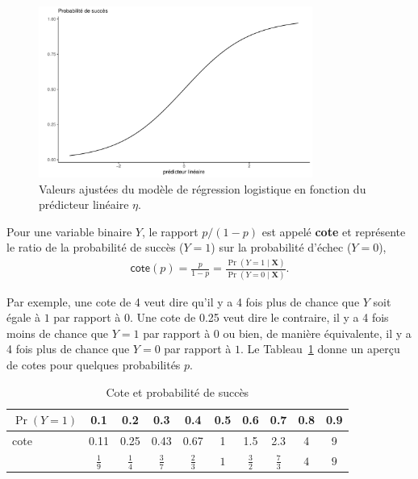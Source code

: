 \documentclass[
  11pt,
  letterpaper,
]{scrbook}
\theoremstyle{definition}
\theoremstyle{remark}
\begin{document}
\begin{figure}[ht!]

{\centering \includegraphics[width=0.8\textwidth,height=\textheight]{reglogistique_files/figure-pdf/fig-logitplot-1.pdf}

}

\caption{\label{fig-logitplot}Valeurs ajustées du modèle de régression
logistique en fonction du prédicteur linéaire \(\eta\).}

\end{figure}

Pour une variable binaire \(Y\), le rapport \(p/(1-p)\) est appelé
\textbf{cote} et représente le ratio de la probabilité de succès
(\(Y=1\)) sur la probabilité d'échec (\(Y=0\)), \begin{align*}
 \mathsf{cote}(p) = \frac{p}{1-p} = \frac{\Pr(Y=1 \mid \mathbf{X})}{\Pr(Y=0 \mid \mathbf{X})}.
\end{align*}

Par exemple, une cote de 4 veut dire qu'il y a 4 fois plus de chance que
\(Y\) soit égale à \(1\) par rapport à \(0\). Une cote de 0.25 veut dire
le contraire, il y a 4 fois moins de chance que \(Y=1\) par rapport à
\(0\) ou bien, de manière équivalente, il y a 4 fois plus de chance que
\(Y=0\) par rapport à \(1\). Le Tableau~\ref{tbl-cotes} donne un aperçu
de cotes pour quelques probabilités \(p\).

\hypertarget{tbl-cotes}{}
\begin{table}
\caption{\label{tbl-cotes}Cote et probabilité de succès }\tabularnewline

\centering
\begin{tabular}{lccccccccc}
\toprule
\(\Pr(Y=1)\) & 0.1 & 0.2 & 0.3 & 0.4 & 0.5 & 0.6 & 0.7 & 0.8 & 0.9\\
\midrule
cote & 0.11 & 0.25 & 0.43 & 0.67 & 1 & 1.5 & 2.3 & 4 & 9\\
 & \(\frac{1}{9}\) & \(\frac{1}{4}\) & \(\frac{3}{7}\) & \(\frac{2}{3}\) & \(1\) & \(\frac{3}{2}\) & \(\frac{7}{3}\) & \(4\) & \(9\)\\
\bottomrule
\end{tabular}
\end{table}
\end{document}
